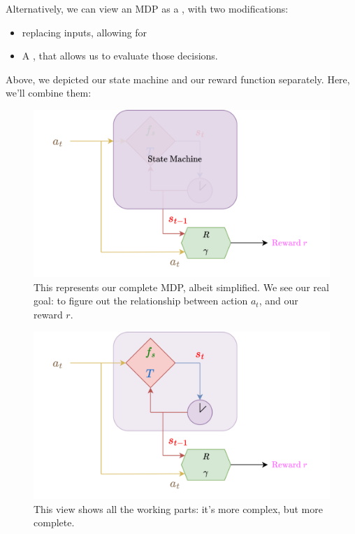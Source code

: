         \phantom{}

        \begin{remark}
            Alternatively, we can view an MDP as a , with two modifications:

            \begin{itemize}
                \item {} replacing inputs, allowing for 
                \item A , that allows us to evaluate those decisions.
            \end{itemize}
        \end{remark}

        Above, we depicted our state machine and our reward function separately. Here, we'll combine them:\\

        \begin{figure}[H]
            \centering
            \includegraphics[width=120mm,scale=0.5]{images/mdp_images/mdp_opaque.png}
            
            \caption*{This represents our complete MDP, albeit simplified. We see our real goal: to figure out the relationship between action $a_t$, and our reward $r$.}
        \end{figure}

        \begin{figure}[H]
            \centering
            \includegraphics[width=120mm,scale=0.5]{images/mdp_images/mdp_transparent.png}
            
            \caption*{This view shows all the working parts: it's more complex, but more complete.}
        \end{figure}

